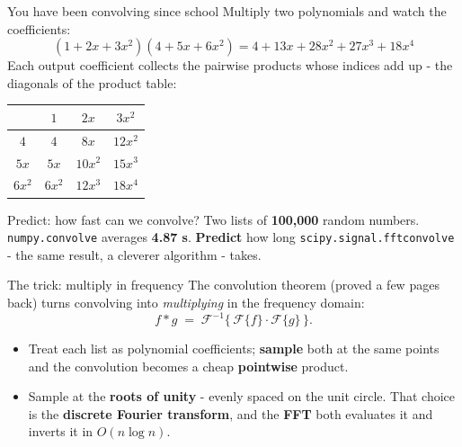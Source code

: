 \documentclass[aspectratio=43]{beamer}
\begin{document}
\begin{frame}{You have been convolving since school}
  Multiply two polynomials and watch the coefficients:
  \[
    (1 + 2x + 3x^2)(4 + 5x + 6x^2) = 4 + 13x + 28x^2 + 27x^3 + 18x^4
  \]
  Each output coefficient collects the pairwise products whose indices add up - the
  diagonals of the product table:
  \vskip 4pt
  \begin{center}\small
    \renewcommand{\arraystretch}{1.2}
    \begin{tabular}{c|ccc}
       & $1$ & $2x$ & $3x^2$\\
      \hline
      $4$    & $4$    & $8x$    & $12x^2$\\
      $5x$   & $5x$   & $10x^2$ & $15x^3$\\
      $6x^2$ & $6x^2$ & $12x^3$ & $18x^4$\\
    \end{tabular}
  \end{center}
  \vskip 4pt
\end{frame}

\begin{frame}{Predict: how fast can we convolve?}
  Two lists of \textbf{100{,}000} random numbers. \texttt{numpy.convolve} averages
  \textbf{4.87 s}. \textbf{Predict} how long \texttt{scipy.signal.fftconvolve} - the same
  result, a cleverer algorithm - takes.
  \pause
  \vskip 8pt
\end{frame}

\begin{frame}{The trick: multiply in frequency}
  The convolution theorem (proved a few pages back) turns convolving into
  \emph{multiplying} in the frequency domain:
  \[
    f \ast g \;=\; \mathcal{F}^{-1}\!\big\{\,\mathcal{F}\{f\}\cdot\mathcal{F}\{g\}\,\big\}.
  \]
  \begin{itemize}\small
    \item Treat each list as polynomial coefficients; \textbf{sample} both at the same
      points and the convolution becomes a cheap \textbf{pointwise} product.
    \item Sample at the \textbf{roots of unity} - evenly spaced on the unit circle. That
      choice is the \textbf{discrete Fourier transform}, and the \textbf{FFT} both evaluates
      it and inverts it in $O(n\log n)$.
  \end{itemize}
  \vskip 4pt
\end{frame}
\end{document}
